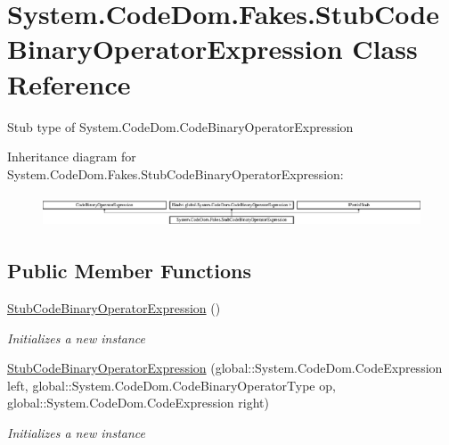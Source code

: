 \hypertarget{class_system_1_1_code_dom_1_1_fakes_1_1_stub_code_binary_operator_expression}{\section{System.\-Code\-Dom.\-Fakes.\-Stub\-Code\-Binary\-Operator\-Expression Class Reference}
\label{class_system_1_1_code_dom_1_1_fakes_1_1_stub_code_binary_operator_expression}
}


Stub type of System.\-Code\-Dom.\-Code\-Binary\-Operator\-Expression 


Inheritance diagram for System.\-Code\-Dom.\-Fakes.\-Stub\-Code\-Binary\-Operator\-Expression\-:\begin{figure}[H]
\begin{center}
\leavevmode
\includegraphics[height=0.949958cm]{class_system_1_1_code_dom_1_1_fakes_1_1_stub_code_binary_operator_expression}
\end{center}
\end{figure}
\subsection*{Public Member Functions}
\begin{DoxyCompactItemize}
\item 
\hyperlink{class_system_1_1_code_dom_1_1_fakes_1_1_stub_code_binary_operator_expression_a6d420c74b6bc4ee511a201a252c9db5f}{Stub\-Code\-Binary\-Operator\-Expression} ()
\begin{DoxyCompactList}\small\item\em Initializes a new instance\end{DoxyCompactList}\item 
\hyperlink{class_system_1_1_code_dom_1_1_fakes_1_1_stub_code_binary_operator_expression_a9cf0b43330aaaf197b30b84fc1e19ff8}{Stub\-Code\-Binary\-Operator\-Expression} (global\-::\-System.\-Code\-Dom.\-Code\-Expression left, global\-::\-System.\-Code\-Dom.\-Code\-Binary\-Operator\-Type op, global\-::\-System.\-Code\-Dom.\-Code\-Expression right)
\begin{DoxyCompactList}\small\item\em Initializes a new instance\end{DoxyCompactList}\end{DoxyCompactItemize}
